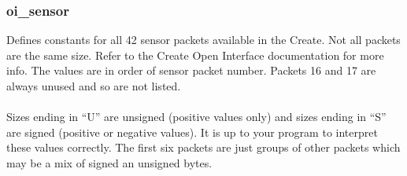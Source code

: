 \documentclass {article}
\begin{document}
\subsubsection {oi\_sensor} \hypertarget{oisensor}{} Defines constants
for all 42 sensor packets available in the Create.  Not all packets
are the same size.  Refer to the Create Open Interface documentation
for more info.  The values are in order of
sensor packet number.  Packets 16 and 17 are always unused and so are not listed. \\
\\
Sizes ending in ``U'' are unsigned (positive values only) and sizes
ending in ``S'' are signed (positive or negative values).  It is up to
your program to interpret these values correctly.  The first six
packets are just groups of other packets which may be a mix of signed
an unsigned bytes.
\end{document}
